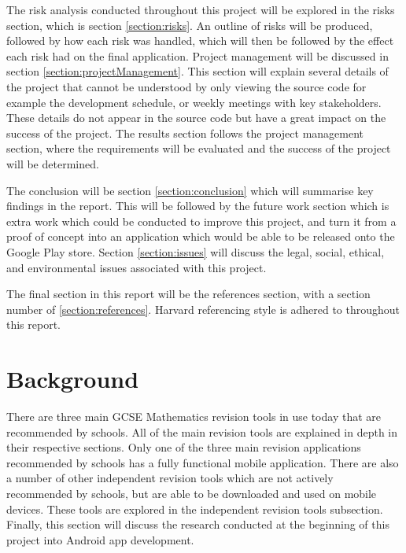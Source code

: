 \documentclass{article}
\begin{document}
The risk analysis conducted throughout this project will be explored in the risks section, which is section \ref{section:risks}. An outline of risks will be produced, followed by how each risk was handled, which will then be followed by the effect each risk had on the final application. Project management will be discussed in section \ref{section:projectManagement}. This section will explain several details of the project that cannot be understood by only viewing the source code for example the development schedule, or weekly meetings with key stakeholders. These details do not appear in the source code but have a great impact on the success of the project. The results section follows the project management section, where the requirements will be evaluated and the success of the project will be determined. \par

The conclusion will be section \ref{section:conclusion} which will summarise key findings in the report. This will be followed by the future work section which is extra work which could be conducted to improve this project, and turn it from a proof of concept into an application which would be able to be released onto the Google Play store. Section \ref{section:issues} will discuss the legal, social, ethical, and environmental issues associated with this project. \par

The final section in this report will be the references section, with a section number of \ref{section:references}. Harvard referencing style is adhered to throughout this report.\par

\section{Background}
\label{section:background}

There are three main GCSE Mathematics revision tools in use today that are recommended by schools. All of the main revision tools are explained in depth in their respective sections. Only one of the three main revision applications recommended by schools has a fully functional mobile application. There are also a number of other independent revision tools which are not actively recommended by schools, but are able to be downloaded and used on mobile devices. These tools are explored in the independent revision tools subsection. Finally, this section will discuss the research conducted at the beginning of this project into Android app development. \par
\end{document}
